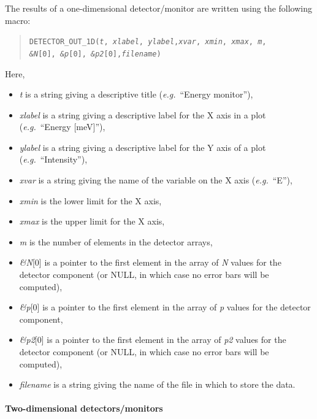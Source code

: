 The results of a one-dimensional detector/\discretionary{}{}{}mon\-i\-tor are written using the
following macro:
\begin{quote}
  \texttt{DETECTOR\_OUT\_1D(\textit{t}, \textit{xlabel}, \textit{ylabel},\textit{xvar}, \textit{xmin}, \textit{xmax}, \textit{m}, \\
    \textit{\&N}[0], \textit{\&p}[0], \textit{\&p2}[0],\textit{filename})}
\end{quote}
Here,
\begin{itemize}
\item \textit{t} is a string giving a descriptive title ({\em e.g.}\ ``Energy
  monitor''),
\item \textit{xlabel} is a string giving a descriptive label for the X
  axis in a plot ({\em e.g.}\ ``Energy [meV]''),
\item \textit{ylabel} is a string giving a descriptive label for the Y
  axis of a plot ({\em e.g.}\ ``Intensity''),
\item \textit{xvar} is a string giving the name of the variable on the X
  axis ({\em e.g.}\ ``E''),
\item \textit{xmin} is the lower limit for the X axis,
\item \textit{xmax} is the upper limit for the X axis,
\item \textit{m} is the number of elements in the detector arrays,
\item \textit{\&N}[0] is a pointer to the first element in the array of \textit{N}
  values for the detector component (or NULL, in which case no error
  bars will be computed),
\item \textit{\&p}[0] is a pointer to the first element in the array of \textit{p}
  values for the detector component,
\item \textit{\&p2}[0] is a pointer to the first element in the array of
  \textit{p2} values for the detector component (or NULL, in which case no error
  bars will be computed),
\item \textit{filename} is a string giving the name of the file in which
  to store the data.
\end{itemize}


\paragraph{Two-dimensional detectors/monitors}

